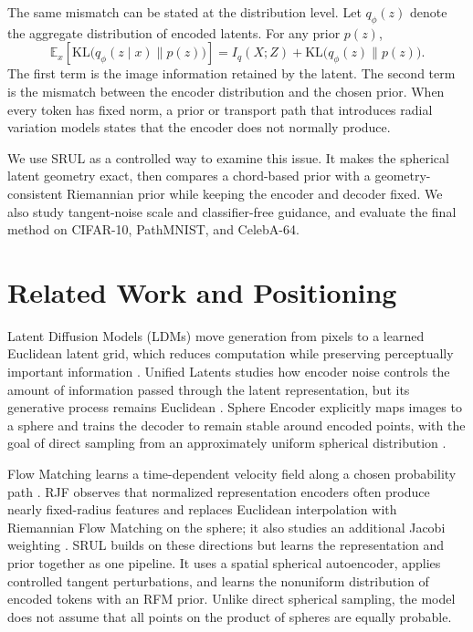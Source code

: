 \documentclass{article}
\begin{document}
The same mismatch can be stated at the distribution level. Let $q_\phi(z)$ denote the aggregate distribution of encoded latents. For any prior $p(z)$,
\begin{equation}
\mathbb E_x\!\left[\mathrm{KL}\big(q_\phi(z\mid x)\|p(z)\big)\right]
= I_q(X;Z)+\mathrm{KL}\big(q_\phi(z)\|p(z)\big).
\label{eq:kl}
\end{equation}
The first term is the image information retained by the latent. The second term is the mismatch between the encoder distribution and the chosen prior. When every token has fixed norm, a prior or transport path that introduces radial variation models states that the encoder does not normally produce.

We use SRUL as a controlled way to examine this issue. It makes the spherical latent geometry exact, then compares a chord-based prior with a geometry-consistent Riemannian prior while keeping the encoder and decoder fixed. We also study tangent-noise scale and classifier-free guidance, and evaluate the final method on CIFAR-10, PathMNIST, and CelebA-64.

\section{Related Work and Positioning}
Latent Diffusion Models (LDMs) move generation from pixels to a learned Euclidean latent grid, which reduces computation while preserving perceptually important information \cite{ldm}. Unified Latents studies how encoder noise controls the amount of information passed through the latent representation, but its generative process remains Euclidean \cite{ul}. Sphere Encoder explicitly maps images to a sphere and trains the decoder to remain stable around encoded points, with the goal of direct sampling from an approximately uniform spherical distribution \cite{sphere}.

Flow Matching learns a time-dependent velocity field along a chosen probability path \cite{fm}. RJF observes that normalized representation encoders often produce nearly fixed-radius features and replaces Euclidean interpolation with Riemannian Flow Matching on the sphere; it also studies an additional Jacobi weighting \cite{rjf}. SRUL builds on these directions but learns the representation and prior together as one pipeline. It uses a spatial spherical autoencoder, applies controlled tangent perturbations, and learns the nonuniform distribution of encoded tokens with an RFM prior. Unlike direct spherical sampling, the model does not assume that all points on the product of spheres are equally probable.
\end{document}

